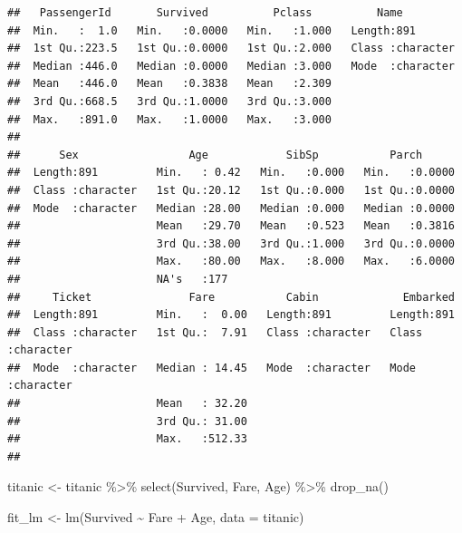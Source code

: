 \documentclass[
  12pt,
]{book}
\newenvironment{Shaded}{\begin{snugshade}}{\end{snugshade}}
\newcommand{\AttributeTok}[1]{\textcolor[rgb]{0.77,0.63,0.00}{#1}}
\newcommand{\FunctionTok}[1]{\textcolor[rgb]{0.00,0.00,0.00}{#1}}
\newcommand{\NormalTok}[1]{#1}
\newcommand{\OtherTok}[1]{\textcolor[rgb]{0.56,0.35,0.01}{#1}}
\newcommand{\SpecialCharTok}[1]{\textcolor[rgb]{0.00,0.00,0.00}{#1}}
\theoremstyle{definition}
\theoremstyle{definition}
\theoremstyle{definition}
\theoremstyle{remark}
\begin{document}
\begin{verbatim}
##   PassengerId       Survived          Pclass          Name          
##  Min.   :  1.0   Min.   :0.0000   Min.   :1.000   Length:891        
##  1st Qu.:223.5   1st Qu.:0.0000   1st Qu.:2.000   Class :character  
##  Median :446.0   Median :0.0000   Median :3.000   Mode  :character  
##  Mean   :446.0   Mean   :0.3838   Mean   :2.309                     
##  3rd Qu.:668.5   3rd Qu.:1.0000   3rd Qu.:3.000                     
##  Max.   :891.0   Max.   :1.0000   Max.   :3.000                     
##                                                                     
##      Sex                 Age            SibSp           Parch       
##  Length:891         Min.   : 0.42   Min.   :0.000   Min.   :0.0000  
##  Class :character   1st Qu.:20.12   1st Qu.:0.000   1st Qu.:0.0000  
##  Mode  :character   Median :28.00   Median :0.000   Median :0.0000  
##                     Mean   :29.70   Mean   :0.523   Mean   :0.3816  
##                     3rd Qu.:38.00   3rd Qu.:1.000   3rd Qu.:0.0000  
##                     Max.   :80.00   Max.   :8.000   Max.   :6.0000  
##                     NA's   :177                                     
##     Ticket               Fare           Cabin             Embarked        
##  Length:891         Min.   :  0.00   Length:891         Length:891        
##  Class :character   1st Qu.:  7.91   Class :character   Class :character  
##  Mode  :character   Median : 14.45   Mode  :character   Mode  :character  
##                     Mean   : 32.20                                        
##                     3rd Qu.: 31.00                                        
##                     Max.   :512.33                                        
## 
\end{verbatim}

\begin{Shaded}
\begin{Highlighting}[]
\NormalTok{titanic }\OtherTok{\textless{}{-}}\NormalTok{ titanic }\SpecialCharTok{\%\textgreater{}\%} \FunctionTok{select}\NormalTok{(Survived, Fare, Age) }\SpecialCharTok{\%\textgreater{}\%} 
    \FunctionTok{drop\_na}\NormalTok{()}

\NormalTok{fit\_lm }\OtherTok{\textless{}{-}} \FunctionTok{lm}\NormalTok{(Survived }\SpecialCharTok{\textasciitilde{}}\NormalTok{ Fare }\SpecialCharTok{+}\NormalTok{ Age, }\AttributeTok{data =}\NormalTok{ titanic)}
\end{Highlighting}
\end{Shaded}
\end{document}
